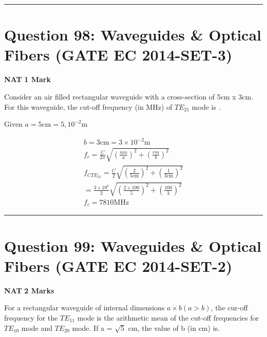 \documentclass[11pt,a4paper]{article}
\begin{document}
\vspace{1.5em}
\hrule
\vspace{1.5em}

\section*{Question 98: Waveguides \& Optical Fibers (GATE EC 2014-SET-3)}
\noindent \textbf{\color{primary}NAT} \hfill \textbf{\color{secondary}1 Mark}


\noindent Consider an air filled rectangular waveguide with a cross-section of 5cm x 3cm. For this waveguide, the cut-off frequency (in MHz) of $TE_{21}$ mode is \underline{\hspace{1.5cm}}.


\begin{tcolorbox}[solbox, title=Detailed Solution -- Question 98]
Given $a=5 \mathrm{cm}=5,10^{-2} \mathrm{m}$

\[
\begin{array}{c} b=3 \mathrm{cm}=3 \times 10^{-2} \mathrm{m} \\ f_{c}=\frac{C}{2 \pi} \sqrt{\left(\frac{n m}{a}\right)^{2}+\left(\frac{r m}{b}\right)^{2}} \\ f_{C T E_{21}}=\frac{C}{2} \sqrt{\left(\frac{2}{5 \mathrm{cm}}\right)^{2}+\left(\frac{1}{3 \mathrm{cm}}\right)^{2}} \\ =\frac{3 \times 10^{8}}{2} \sqrt{\left(\frac{2 \times 100}{5}\right)^{2}+\left(\frac{100}{3}\right)^{2}} \\ f_{c}=7810 \mathrm{MHz} \end{array}
\]
\end{tcolorbox}

\vspace{1.5em}
\hrule
\vspace{1.5em}

\section*{Question 99: Waveguides \& Optical Fibers (GATE EC 2014-SET-2)}
\noindent \textbf{\color{primary}NAT} \hfill \textbf{\color{secondary}2 Marks}


\noindent For a rectangular waveguide of internal dimensions $a \times b(a > b)$, the cur-off
frequency for the $TE_{11}$ mode is the arithmetic mean of the cut-off frequencies for $TE_{10}$ mode and $TE_{20}$ mode. If a = $\sqrt{5}$ cm, the value of b (in cm) is\underline{\hspace{1.5cm}}.
\end{document}
